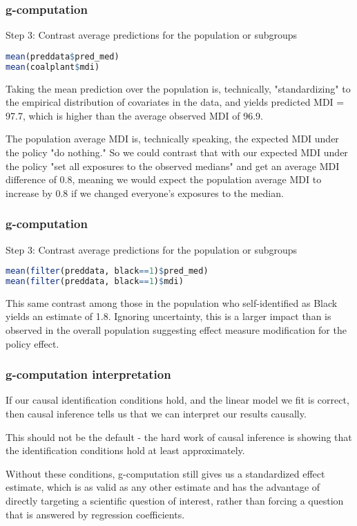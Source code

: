 \begin{frame}[t, fragile]
  \frametitle{g-computation}
Step 3: Contrast average predictions for the population or subgroups
\begin{lstlisting}[language=R]
mean(preddata$pred_med)
mean(coalplant$mdi)
\end{lstlisting}
Taking the mean prediction over the population is, technically, "standardizing" to the empirical distribution of covariates in the data, and yields predicted MDI = 97.7, which is higher than the average observed MDI of 96.9. 
\bigskip

The population average MDI is, technically speaking, the expected MDI under the policy "do nothing." So we could contrast that with our expected MDI under the policy "set all exposures to the observed medians" and get an average MDI difference of 0.8, meaning we would expect the population average MDI to increase by 0.8 if we changed everyone's exposures to the median.
\end{frame}

\begin{frame}[t, fragile]
  \frametitle{g-computation}
Step 3: Contrast average predictions for the population or subgroups
\begin{lstlisting}[language=R]
mean(filter(preddata, black==1)$pred_med)
mean(filter(preddata, black==1)$mdi)
\end{lstlisting}
This same contrast among those in the population who self-identified as Black yields an estimate of 1.8. Ignoring uncertainty, this is a larger impact than is observed in the overall population suggesting effect measure modification for the policy effect. 
\end{frame}


\begin{frame}[t, fragile]
  \frametitle{g-computation interpretation}
If our causal identification conditions hold, and the linear model we fit is correct, then causal inference tells us that we can interpret our results causally.
\bigskip

This should not be the default - the hard work of causal inference is showing that the identification conditions hold at least approximately.
\bigskip

Without these conditions, g-computation still gives us a standardized effect estimate, which is as valid as any other estimate and has the advantage of directly targeting a scientific question of interest, rather than forcing a question that is answered by regression coefficients.
\end{frame}


